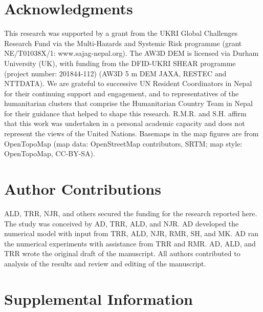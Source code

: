 \documentclass[preprint,12pt,authoryear]{elsarticle}
\begin{document}
\section*{Acknowledgments}
This research was supported by a grant from the UKRI Global Challenges Research Fund via the Multi-Hazards and Systemic Risk programme (grant NE/T01038X/1: www.sajag-nepal.org). The AW3D DEM is licensed via Durham University (UK), with funding from the DFID-UKRI SHEAR programme (project number: 201844-112) (AW3D 5 m DEM \textcopyright JAXA, RESTEC and NTTDATA). We are grateful to successive UN Resident Coordinators in Nepal for their continuing support and engagement, and to representatives of the humanitarian clusters that comprise the Humanitarian Country Team in Nepal for their guidance that helped to shape this research. R.M.R. and S.H. affirm that this work was undertaken in a personal academic capacity and does not represent the views of the United Nations. Basemaps in the map figures are from OpenTopoMap (map data: \textcopyright{} OpenStreetMap contributors, SRTM; map style: \textcopyright{} OpenTopoMap, CC-BY-SA).

\section*{Author Contributions}
ALD, TRR, NJR, and others secured the funding for the research reported here. The study was conceived by AD, TRR, ALD, and NJR. AD developed the numerical model with input from TRR, ALD, NJR, RMR, SH, and MK. AD ran the numerical experiments with assistance from TRR and RMR. AD, ALD, and TRR wrote the original draft of the manuscript. All authors contributed to analysis of the results and review and editing of the manuscript.



\clearpage
\appendix
\renewcommand{\thefigure}{S\arabic{figure}}
\setcounter{figure}{0}

\section*{Supplemental Information}
\end{document}
